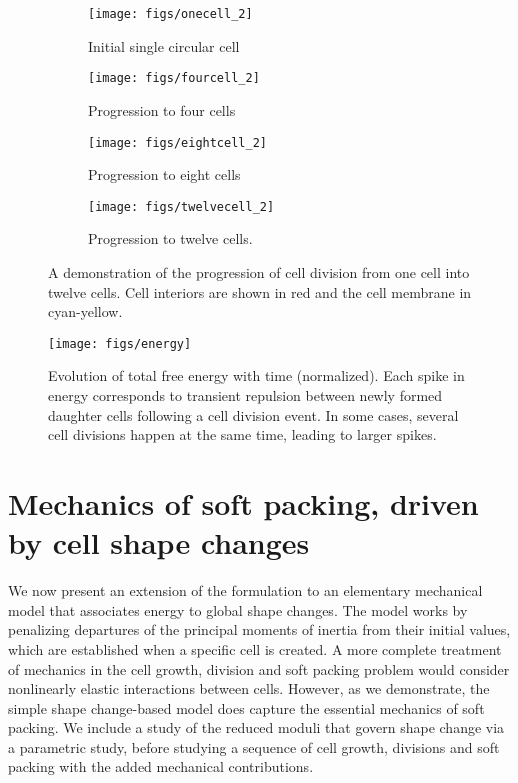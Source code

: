 \documentclass{article}
\begin{document}
\begin{figure}[h!]
	\centering
	\begin{subfigure}[h!]{0.4\textwidth}
		\texttt{[image: figs/onecell\_2]}
		\caption{Initial single circular cell}
		\label{fig:onecell}
	\end{subfigure}
	\begin{subfigure}[h!]{0.4\textwidth}
		\texttt{[image: figs/fourcell\_2]}
		\caption{Progression to four cells}
		\label{fig:fourcell}
	\end{subfigure}
	\begin{subfigure}[h!]{0.4\textwidth}
		\texttt{[image: figs/eightcell\_2]}
		\caption{Progression to eight cells}
		\label{fig:eightcell}
	\end{subfigure}
	\begin{subfigure}[h!]{0.4\textwidth}
		\texttt{[image: figs/twelvecell\_2]}
		\caption{Progression to twelve cells.}
		\label{fig:twelvecell}
	\end{subfigure}
	\caption{A demonstration of the progression of cell division from one cell into twelve cells. Cell interiors are shown in red and the cell membrane in cyan-yellow.}
	\label{fig:celldivision}
\end{figure}

\begin{figure}[h!]
\centering
\texttt{[image: figs/energy]}
\caption{Evolution of total free energy with time (normalized). Each spike in energy corresponds to transient repulsion between newly formed daughter cells following a cell division event. In some cases, several cell divisions happen at the same time, leading to larger spikes.}
\label{fig:energy}
\end{figure}

\iffalse
\begin{figure}[h!]
\centering
\texttt{[image: figs/mesh]}
\caption{A demonstration of the progression of cell division. Use this as an example for the other figures. Replace this with a single collage of figure showing the progression of 1-12 cells. Show no legends, bounding box, etc.}
\label{fig:celldivision1}
\end{figure}
\fi

\section{Mechanics of soft packing, driven by cell shape changes}
\label{sec:mechformulation}
We now present an extension of the formulation to an elementary mechanical model that associates energy to global shape changes. The model works by penalizing departures of the principal moments of inertia from their initial values, which are established when a specific cell is created. A more complete treatment of mechanics in the cell growth, division and soft packing problem would consider nonlinearly elastic interactions between cells. However, as we demonstrate, the simple shape change-based model does capture the essential mechanics of soft packing. We include a study of the reduced moduli that govern shape change via a parametric study, before studying a sequence of cell growth, divisions and soft packing with the added mechanical contributions.
\end{document}
